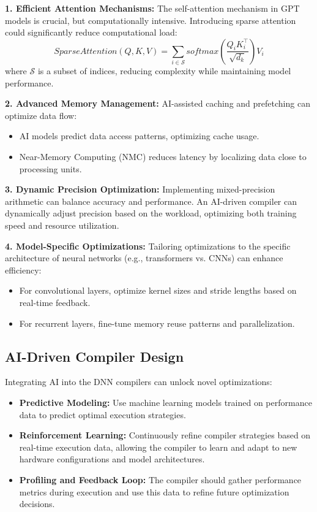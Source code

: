 \documentclass{article}
\begin{document}
\textbf{1. Efficient Attention Mechanisms:} The self-attention mechanism in GPT models is crucial, but computationally intensive. Introducing sparse attention could significantly reduce computational load:
\[
\textit{SparseAttention}(Q, K, V) = \sum_{i \in \mathcal{S}} \textit{softmax}\left(\frac{Q_iK_i^\top}{\sqrt{d_k}}\right)V_i
\]
where \( \mathcal{S} \) is a subset of indices, reducing complexity while maintaining model performance.

\textbf{2. Advanced Memory Management:} AI-assisted caching and prefetching can optimize data flow:
\begin{itemize}
    \item AI models predict data access patterns, optimizing cache usage.
    \item Near-Memory Computing (NMC) reduces latency by localizing data close to processing units.
\end{itemize}

\textbf{3. Dynamic Precision Optimization:} Implementing mixed-precision arithmetic can balance accuracy and performance. An AI-driven compiler can dynamically adjust precision based on the workload, optimizing both training speed and resource utilization.

\textbf{4. Model-Specific Optimizations:} Tailoring optimizations to the specific architecture of neural networks (e.g., transformers vs. CNNs) can enhance efficiency:
\begin{itemize}
    \item For convolutional layers, optimize kernel sizes and stride lengths based on real-time feedback.
    \item For recurrent layers, fine-tune memory reuse patterns and parallelization.
\end{itemize}

\subsection{AI-Driven Compiler Design}

Integrating AI into the DNN compilers can unlock novel optimizations:
\begin{itemize}
    \item \textbf{Predictive Modeling:} Use machine learning models trained on performance data to predict optimal execution strategies.
    \item \textbf{Reinforcement Learning:} Continuously refine compiler strategies based on real-time execution data, allowing the compiler to learn and adapt to new hardware configurations and model architectures.
    \item \textbf{Profiling and Feedback Loop:} The compiler should gather performance metrics during execution and use this data to refine future optimization decisions.
\end{itemize}
\end{document}
